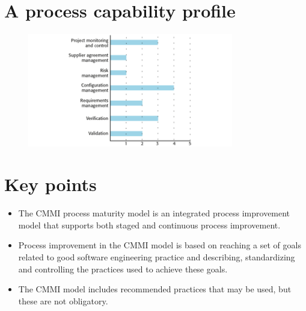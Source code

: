 \section{A process capability profile}
\begin{figure}[h!]
    \centering
    \includegraphics[width = 0.8\textwidth]{./figures/L9_6.png}
    \caption{}
    \label{fig:L9_6}
\end{figure}

\section{Key points}
\begin{itemize}

\item The CMMI process maturity model is an integrated process improvement model that supports both staged and continuous process improvement.

\item Process improvement in the CMMI model is based on reaching a set of goals related to good software engineering practice and describing, standardizing and controlling the practices used to achieve these goals.

\item The CMMI model includes recommended practices that may be used, but these are not obligatory.
\end{itemize}
